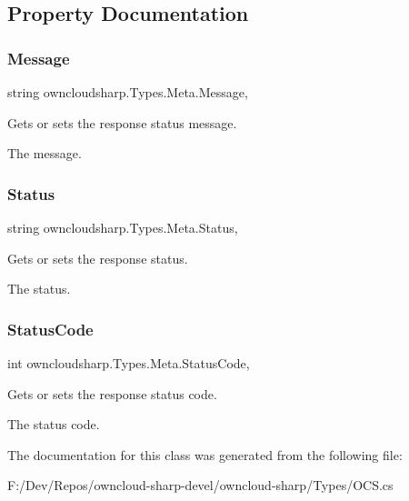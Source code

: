 \subsection{Property Documentation}
\mbox{\label{classowncloudsharp_1_1_types_1_1_meta_a2dcb4b0826692240c02ee824cd84b62b}} 
\subsubsection{\texorpdfstring{Message}{Message}}
{\footnotesize\ttfamily string owncloudsharp.\+Types.\+Meta.\+Message\hspace{0.3cm}{\ttfamily [get]}, {\ttfamily [set]}}



Gets or sets the response status message. 

The message.\mbox{\label{classowncloudsharp_1_1_types_1_1_meta_acdc52e0c7e0df65d17a7247e1527f518}} 
\subsubsection{\texorpdfstring{Status}{Status}}
{\footnotesize\ttfamily string owncloudsharp.\+Types.\+Meta.\+Status\hspace{0.3cm}{\ttfamily [get]}, {\ttfamily [set]}}



Gets or sets the response status. 

The status.\mbox{\label{classowncloudsharp_1_1_types_1_1_meta_a8322438609748cc7c0fca4984daf39c2}} 
\subsubsection{\texorpdfstring{Status\+Code}{StatusCode}}
{\footnotesize\ttfamily int owncloudsharp.\+Types.\+Meta.\+Status\+Code\hspace{0.3cm}{\ttfamily [get]}, {\ttfamily [set]}}



Gets or sets the response status code. 

The status code.

The documentation for this class was generated from the following file\+:\begin{DoxyCompactItemize}
\item 
F\+:/\+Dev/\+Repos/owncloud-\/sharp-\/devel/owncloud-\/sharp/\+Types/O\+C\+S.\+cs\end{DoxyCompactItemize}
